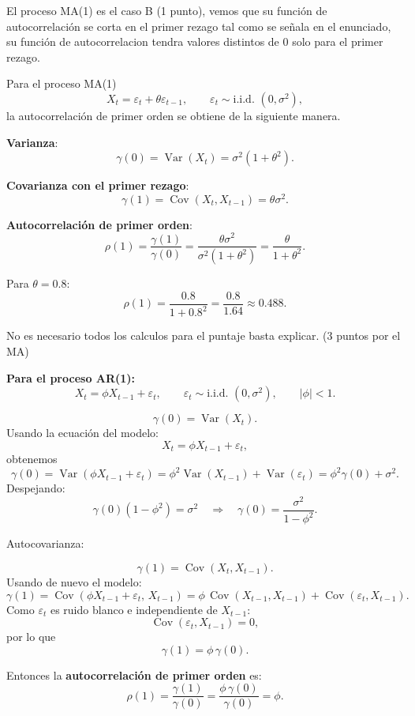 \documentclass[10pt,a4paper]{article}
\begin{document}
\begin{enumerate}
\begin{enumerate}
 {\color{blue}   El proceso MA(1) es el caso B (1 punto), vemos que su función de autocorrelación se corta en el primer rezago tal como se señala en el enunciado, su función de autocorrelacion tendra valores distintos de 0 solo para el primer rezago.

    Para el proceso MA(1)
\[
X_t = \varepsilon_t + \theta \varepsilon_{t-1}, 
\qquad \varepsilon_t \sim \text{i.i.d. }(0,\sigma^2),
\]
la autocorrelación de primer orden se obtiene de la siguiente manera.

\textbf{Varianza}:
\[
\gamma(0) = \operatorname{Var}(X_t)
= \sigma^2(1+\theta^2).
\]

\textbf{Covarianza con el primer rezago}:
\[
\gamma(1) 
= \operatorname{Cov}(X_t, X_{t-1})
= \theta \sigma^2.
\]

\textbf{Autocorrelación de primer orden}:
\[
\rho(1) 
= \frac{\gamma(1)}{\gamma(0)}
= \frac{\theta \sigma^2}{\sigma^2 (1+\theta^2)}
= \frac{\theta}{1+\theta^2}.
\]

Para \(\theta = 0.8\):
\[
\rho(1) = \frac{0.8}{1 + 0.8^2}
= \frac{0.8}{1.64}
\approx 0.488.
\]

No es necesario todos los calculos para el puntaje basta explicar. (3 puntos por el MA)
\vspace{0.5cm}

{\bf Para el proceso AR(1):}
\[
X_t = \phi X_{t-1} + \varepsilon_t,
\qquad \varepsilon_t \sim \text{i.i.d. } (0,\sigma^2), 
\qquad |\phi| < 1.
\]


\[
\gamma(0) = \operatorname{Var}(X_t).
\]
Usando la ecuación del modelo:
\[
X_t = \phi X_{t-1} + \varepsilon_t,
\]
obtenemos
\[
\gamma(0) 
= \operatorname{Var}(\phi X_{t-1} + \varepsilon_t)
= \phi^2 \operatorname{Var}(X_{t-1}) + \operatorname{Var}(\varepsilon_t)
= \phi^2 \gamma(0) + \sigma^2.
\]
Despejando:
\[
\gamma(0)(1 - \phi^2) = \sigma^2
\quad\Rightarrow\quad
\gamma(0) = \frac{\sigma^2}{1-\phi^2}.
\]

Autocovarianza:

\[
\gamma(1) = \operatorname{Cov}(X_t, X_{t-1}).
\]
Usando de nuevo el modelo:
\[
\gamma(1) 
= \operatorname{Cov}(\phi X_{t-1} + \varepsilon_t,\, X_{t-1})
= \phi\,\operatorname{Cov}(X_{t-1}, X_{t-1})
    + \operatorname{Cov}(\varepsilon_t, X_{t-1}).
\]
Como $\varepsilon_t$ es ruido blanco e independiente de $X_{t-1}$:
\[
\operatorname{Cov}(\varepsilon_t, X_{t-1}) = 0,
\]
por lo que
\[
\gamma(1) = \phi\,\gamma(0).
\]

Entonces la \textbf{autocorrelación de primer orden} es:
\[
\rho(1) = \frac{\gamma(1)}{\gamma(0)} = \frac{\phi\,\gamma(0)}{\gamma(0)} = \phi.
\]



}
\end{enumerate}
\end{enumerate}
\end{document}
